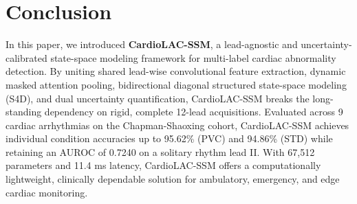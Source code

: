\documentclass[journal]{IEEEtran}
\begin{document}
\section{Conclusion}
In this paper, we introduced \textbf{CardioLAC-SSM}, a lead-agnostic and uncertainty-calibrated state-space modeling framework for multi-label cardiac abnormality detection. By uniting shared lead-wise convolutional feature extraction, dynamic masked attention pooling, bidirectional diagonal structured state-space modeling (S4D), and dual uncertainty quantification, CardioLAC-SSM breaks the long-standing dependency on rigid, complete 12-lead acquisitions. Evaluated across 9 cardiac arrhythmias on the Chapman-Shaoxing cohort, CardioLAC-SSM achieves individual condition accuracies up to 95.62\% (PVC) and 94.86\% (STD) while retaining an AUROC of 0.7240 on a solitary rhythm lead II. With 67,512 parameters and 11.4 ms latency, CardioLAC-SSM offers a computationally lightweight, clinically dependable solution for ambulatory, emergency, and edge cardiac monitoring.

\appendices
\end{document}
